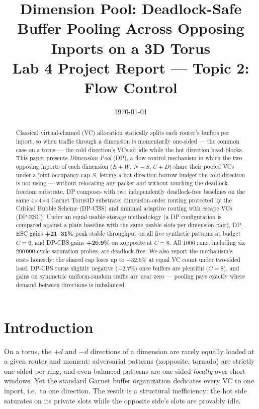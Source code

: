 \documentclass[10pt]{article}
\title{Dimension Pool: Deadlock-Safe Buffer Pooling Across Opposing
Inports on a 3D Torus\\
\large Lab 4 Project Report --- Topic 2: Flow Control}
\author{}
\date{\today}
\begin{document}
\maketitle

\begin{abstract}
Classical virtual-channel (VC) allocation statically splits each router's
buffers per inport, so when traffic through a dimension is momentarily
one-sided --- the common case on a torus --- the cold direction's VCs sit
idle while the hot direction head-blocks. This paper presents
\emph{Dimension Pool} (DP), a flow-control mechanism in which the two
opposing inports of each dimension ($E{+}W$, $N{+}S$, $U{+}D$) share their
pooled VCs under a joint occupancy cap $S$, letting a hot direction borrow
budget the cold direction is not using --- without relocating any packet
and without touching the deadlock-freedom substrate. DP composes with two
independently deadlock-free baselines on the same 4$\times$4$\times$4
Garnet Torus3D substrate: dimension-order routing protected by the
Critical Bubble Scheme (DP-CBS) and minimal adaptive routing with escape
VCs (DP-ESC). Under an equal-usable-storage methodology (a DP
configuration is compared against a plain baseline with the same usable
slots per dimension pair), DP-ESC gains \textbf{+21--31\%} peak stable
throughput on all five synthetic patterns at budget $C{=}6$, and DP-CBS
gains \textbf{+20.9\%} on xopposite at $C{=}6$. All 1006 runs, including
six 200\,000-cycle saturation probes, are deadlock-free. We also report
the mechanism's costs honestly: the shared cap loses up to $-32.6\%$ at
equal VC count under two-sided load, DP-CBS turns slightly negative
($-2.7\%$) once buffers are plentiful ($C{=}8$), and gains on symmetric
uniform-random traffic are near zero --- pooling pays exactly where demand
between directions is imbalanced.
\end{abstract}

\section{Introduction}

On a torus, the $+d$ and $-d$ directions of a dimension are rarely equally
loaded at a given router and moment: adversarial patterns (xopposite,
tornado) are strictly one-sided per ring, and even balanced patterns are
one-sided \emph{locally} over short windows. Yet the standard Garnet
buffer organization dedicates every VC to one inport, i.e.\ to one
direction. The result is a structural inefficiency: the hot side
saturates on its private slots while the opposite side's slots are
provably idle.
\end{document}

